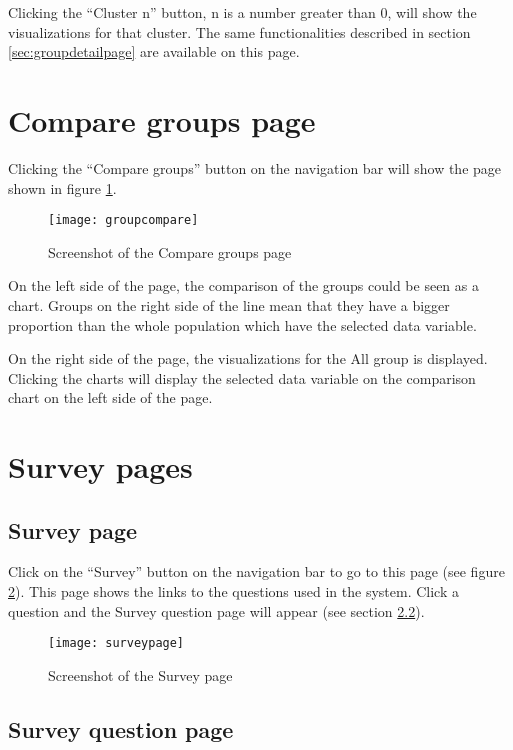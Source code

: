 Clicking the ``Cluster n'' button, n is a number 	greater than 0, will show the visualizations for that cluster. The same functionalities described in section \ref{sec:groupdetailpage} are available on this page.

\section{Compare groups page}

Clicking the ``Compare groups'' button on the navigation bar will show the page shown in figure \ref{fig:groupcompare}.\par

\begin{figure}[h]
\centering
\texttt{[image: groupcompare]}
\caption{Screenshot of the Compare groups page}
\label{fig:groupcompare}
\end{figure}

On the left side of the page, the comparison of the groups could be seen as a chart. Groups on the right side of the line mean that they have a bigger proportion than the whole population which have the selected data variable.\par

On the right side of the page, the visualizations for the All group is displayed. Clicking the charts will display the selected data variable on the comparison chart on the left side of the page.\par

\section{Survey pages}

\subsection{Survey page}

Click on the ``Survey'' button on the navigation bar to go to this page (see figure \ref{fig:surveypage}). This page shows the links to the questions used in the system. Click a question and the Survey question page will appear (see section \ref{sec:questionpage}).

\begin{figure}[h]
\centering
\texttt{[image: surveypage]}
\caption{Screenshot of the Survey page}
\label{fig:surveypage}
\end{figure}

\subsection{Survey question page} \label{sec:questionpage}

